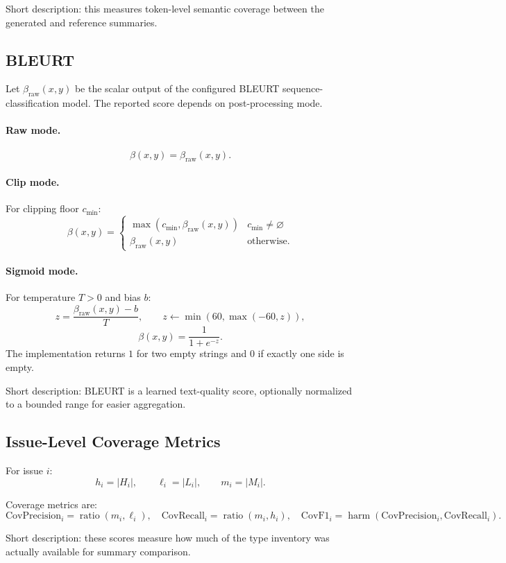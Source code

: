 \documentclass[11pt]{article}
\begin{document}
Short description: this measures token-level semantic coverage between the generated and reference summaries.

\subsection{BLEURT}
Let $\beta_{\mathrm{raw}}(x,y)$ be the scalar output of the configured BLEURT sequence-classification model. The reported score depends on post-processing mode.

\paragraph{Raw mode.}
\[
\beta(x,y)=\beta_{\mathrm{raw}}(x,y).
\]

\paragraph{Clip mode.}
For clipping floor $c_{\min}$:
\[
\beta(x,y)=
\begin{cases}
\max(c_{\min},\beta_{\mathrm{raw}}(x,y)) & c_{\min}\neq \varnothing\\
\beta_{\mathrm{raw}}(x,y) & \text{otherwise}.
\end{cases}
\]

\paragraph{Sigmoid mode.}
For temperature $T>0$ and bias $b$:
\[
z=\frac{\beta_{\mathrm{raw}}(x,y)-b}{T},
\qquad
z \leftarrow \min(60,\max(-60,z)),
\]
\[
\beta(x,y)=\frac{1}{1+e^{-z}}.
\]
The implementation returns $1$ for two empty strings and $0$ if exactly one side is empty.

Short description: BLEURT is a learned text-quality score, optionally normalized to a bounded range for easier aggregation.

\subsection{Issue-Level Coverage Metrics}
For issue $i$:
\[
h_i = |H_i|,\qquad
\ell_i = |L_i|,\qquad
m_i = |M_i|.
\]

Coverage metrics are:
\[
\mathrm{CovPrecision}_i=\operatorname{ratio}(m_i,\ell_i),\quad
\mathrm{CovRecall}_i=\operatorname{ratio}(m_i,h_i),\quad
\mathrm{CovF1}_i=\operatorname{harm}(\mathrm{CovPrecision}_i,\mathrm{CovRecall}_i).
\]

Short description: these scores measure how much of the type inventory was actually available for summary comparison.
\end{document}
